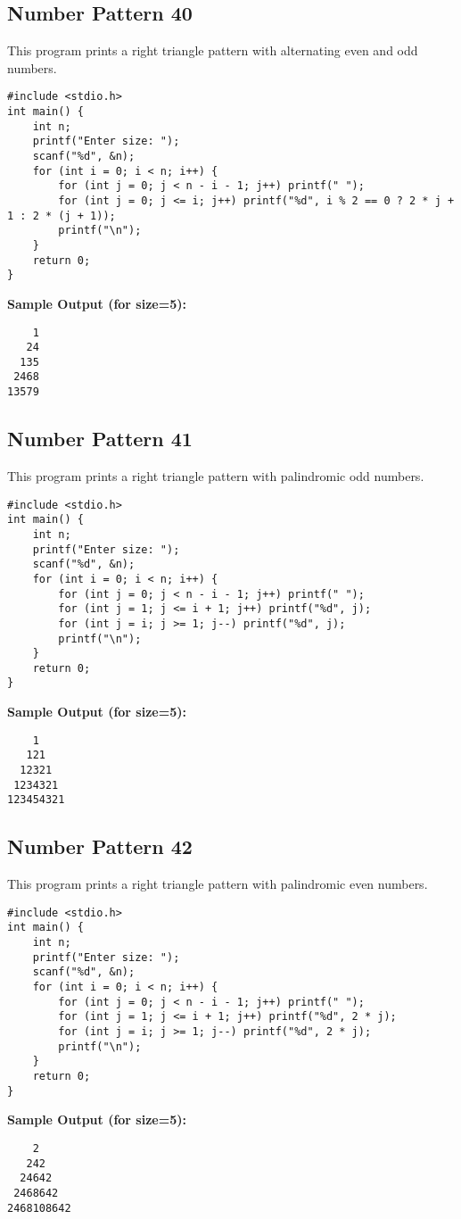 \documentclass[a4paper,12pt]{article}
\begin{document}
\subsection{Number Pattern 40}
This program prints a right triangle pattern with alternating even and odd numbers.
\begin{lstlisting}[caption={Number Pattern 40}]
#include <stdio.h>
int main() {
    int n;
    printf("Enter size: ");
    scanf("%d", &n);
    for (int i = 0; i < n; i++) {
        for (int j = 0; j < n - i - 1; j++) printf(" ");
        for (int j = 0; j <= i; j++) printf("%d", i % 2 == 0 ? 2 * j + 1 : 2 * (j + 1));
        printf("\n");
    }
    return 0;
}
\end{lstlisting}
\textbf{Sample Output (for size=5):}
\begin{verbatim}
    1
   24
  135
 2468
13579
\end{verbatim}
\clearpage

\subsection{Number Pattern 41}
This program prints a right triangle pattern with palindromic odd numbers.
\begin{lstlisting}[caption={Number Pattern 41}]
#include <stdio.h>
int main() {
    int n;
    printf("Enter size: ");
    scanf("%d", &n);
    for (int i = 0; i < n; i++) {
        for (int j = 0; j < n - i - 1; j++) printf(" ");
        for (int j = 1; j <= i + 1; j++) printf("%d", j);
        for (int j = i; j >= 1; j--) printf("%d", j);
        printf("\n");
    }
    return 0;
}
\end{lstlisting}
\textbf{Sample Output (for size=5):}
\begin{verbatim}
    1
   121
  12321
 1234321
123454321
\end{verbatim}
\clearpage

\subsection{Number Pattern 42}
This program prints a right triangle pattern with palindromic even numbers.
\begin{lstlisting}[caption={Number Pattern 42}]
#include <stdio.h>
int main() {
    int n;
    printf("Enter size: ");
    scanf("%d", &n);
    for (int i = 0; i < n; i++) {
        for (int j = 0; j < n - i - 1; j++) printf(" ");
        for (int j = 1; j <= i + 1; j++) printf("%d", 2 * j);
        for (int j = i; j >= 1; j--) printf("%d", 2 * j);
        printf("\n");
    }
    return 0;
}
\end{lstlisting}
\textbf{Sample Output (for size=5):}
\begin{verbatim}
    2
   242
  24642
 2468642
2468108642
\end{verbatim}
\clearpage
\end{document}
